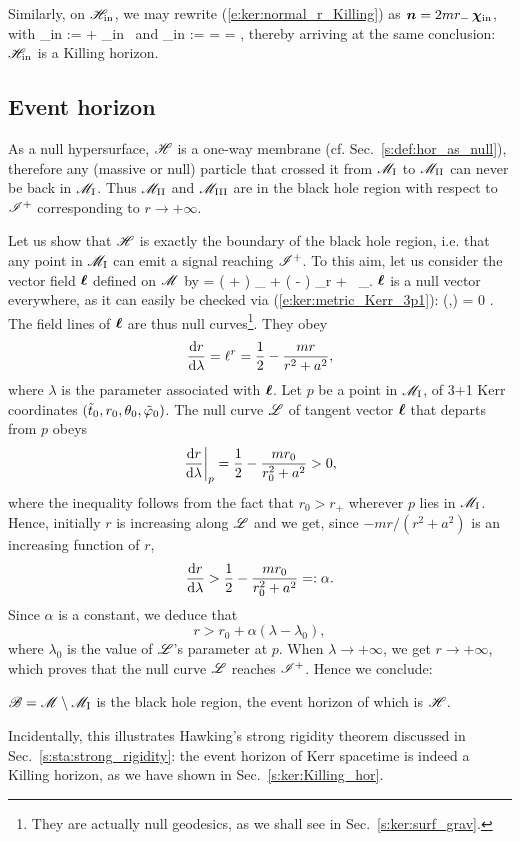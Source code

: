 Similarly, on $\mathscr{H}_{\rm in}$, we may rewrite (\ref{e:ker:normal_r_Killing})
as $\bm{n} = 2 m r_- \, \bm{\chi}_{\rm in}$, with
\be
    \w{\chi}_{\rm in} := \w{\xi} + \Omega_{\rm in} \, \w{\eta}
\ee
and
\be
    \Omega_{\rm in} :=  = 
        =  ,
\ee
thereby arriving at the same conclusion: $\mathscr{H}_{\rm in}$ is a Killing horizon.

\subsection{Event horizon}

As a null hypersurface, $\mathscr{H}$ is a one-way membrane (cf. Sec.~\ref{s:def:hor_as_null}),
therefore any (massive or null) particle that crossed it from $\mathscr{M}_{\rm I}$ to
$\mathscr{M}_{\rm II}$ can never be back in $\mathscr{M}_{\rm I}$.
Thus $\mathscr{M}_{\rm II}$ and $\mathscr{M}_{\rm III}$ are in the black hole region with respect to
$\mathscr{I}^+$ corresponding to $r\rightarrow +\infty$.

Let us show that $\mathscr{H}$ is exactly the boundary of the black hole region, i.e.
that any point in $\mathscr{M}_{\rm I}$ can emit a signal reaching $\mathscr{I}^+$.
To this aim, let us consider the vector field $\bm{\ell}$ defined on $\mathscr{M}$ by
\be \label{e:ker:def_ell_outgoing}
    \wl = \left(  +  \right) \wpar_\ti
        + \left(  -  \right) \wpar_{\tilde r}
        +  \, \wpar_\tph .
\ee
$\bm{\ell}$ is a null vector everywhere, as it can easily be checked
via (\ref{e:ker:metric_Kerr_3p1}):
\be
    (\wl,\wl) = 0 .
\ee
The field lines of $\bm{\ell}$ are thus null curves\footnote{They are actually
null geodesics, as we shall see in Sec.~\ref{s:ker:surf_grav}.}. They obey
\[
   \frac{\mathrm{d} r}{\mathrm{d}\lambda} = \ell^r = \frac{1}{2} - \frac{m r}{r^2 + a^2} ,
\]
where $\lambda$ is the parameter associated with $\bm{\ell}$.
Let $p$ be a point in $\mathscr{M}_{\rm I}$, of 3+1 Kerr coordinates $({\tilde t}_0,r_0,\theta_0,{\tilde\varphi}_0)$.
The null curve $\mathscr{L}$ of tangent vector $\bm{\ell}$ that departs from $p$ obeys
\[
    \left. \frac{\mathrm{d} r}{\mathrm{d}\lambda} \right| _{p} = \frac{1}{2} - \frac{m r_0}{r_0^2 + a^2} > 0 ,
\]
where the inequality follows from the fact that $r_0 > r_+$ wherever $p$ lies in
$\mathscr{M}_{\rm I}$.
Hence, initially $r$ is increasing along $\mathscr{L}$ and we get, since $-mr/(r^2+a^2)$ is an
increasing function of $r$,
\[
    \frac{\mathrm{d} r}{\mathrm{d}\lambda} > \frac{1}{2} - \frac{m r_0}{r_0^2 + a^2} =: \alpha .
\]
Since $\alpha$ is a constant, we deduce that
\[
    r > r_0 + \alpha(\lambda - \lambda_0) ,
\]
where $\lambda_0$ is the value of $\mathscr{L}$'s parameter at $p$. When $\lambda\rightarrow +\infty$,
we get $r\rightarrow +\infty$, which proves that the null curve $\mathscr{L}$
reaches $\mathscr{I}^+$. Hence we conclude:
\begin{greybox}
$\mathscr{B} = \mathscr{M} \setminus \mathscr{M}_{\rm I}$ is the black hole region, the event
horizon of which is $\mathscr{H}$.
\end{greybox}
Incidentally, this illustrates Hawking's strong rigidity theorem discussed
in Sec.~\ref{s:sta:strong_rigidity}: the event horizon of Kerr spacetime
is indeed a Killing horizon, as we have shown in Sec.~\ref{s:ker:Killing_hor}.

